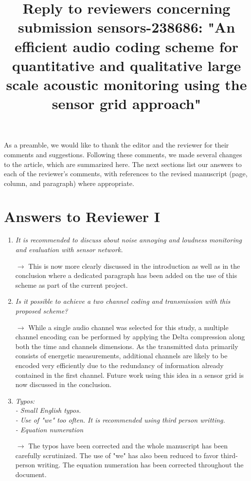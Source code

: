 \documentclass[10pt]{article}
\title{Reply to reviewers concerning submission sensors-238686: "An efficient audio coding scheme  for quantitative and qualitative large scale acoustic monitoring using the sensor grid approach"}
\begin{document}
\maketitle

As a preamble, we would like to thank the editor and the reviewer for their comments and suggestions. Following these comments, we made several changes to the article, which are summarized here. The next sections list our answers to each of the reviewer’s comments, with references to the revised manuscript (page, column, and paragraph) where appropriate.


\section{Answers to Reviewer I}

\begin{enumerate}

\item \emph{It is recommended to discuss about noise annoying and loudness monitoring and evaluation with sensor network.}

$\rightarrow$ This is now more clearly discussed in the introduction as well as in the conclusion where a dedicated paragraph has been added on the use of this scheme as part of the current project.

\item \emph{Is it possible to achieve a two channel coding and transmission with this proposed scheme?}

$\rightarrow$ While a single audio channel was selected for this study, a multiple channel encoding can be performed by applying the Delta compression along both the time and channels dimensions. As the transmitted data primarily consists of energetic measurements, additional channels are likely to be encoded very efficiently due to the redundancy of information already contained in the first channel. Future work using this idea in a sensor grid is now discussed in the conclusion.

\item \emph{Typos:\\
- Small English typos.\\
- Use of "we" too often. It is recommended using third person writting.\\
- Equation numeration}

$\rightarrow$ The typos have been corrected and the whole manuscript has been carefully scrutinized. The use of "we" has also been reduced to favor third-person writing. The equation numeration has been corrected throughout the document.

\end{enumerate}
\end{document}
